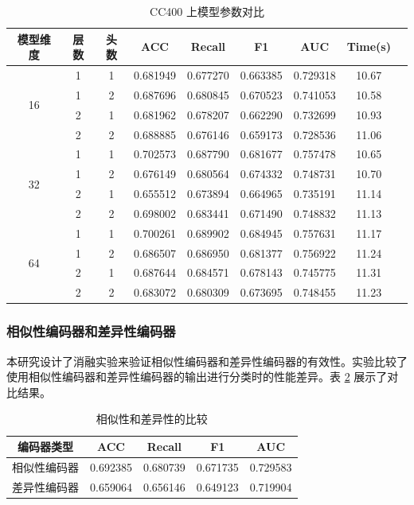 \documentclass[12pt,a4paper]{article}
\begin{document}
\begin{table}[H]
\centering
\caption{CC400 上模型参数对比}
\label{tab:attention_ablation}
\scriptsize
\begin{tabular}{ccccccccc}
\toprule
模型维度 & 层数 & 头数 & ACC & Recall & F1 & AUC & Time(s) \\
\midrule
\multirow{4}{*}{16} & 1 & 1 & 0.681949 & 0.677270 & 0.663385 & 0.729318 & 10.67 \\
 & 1 & 2 & 0.687696 & 0.680845 & 0.670523 & 0.741053 & 10.58 \\
 & 2 & 1 & 0.681962 & 0.678207 & 0.662290 & 0.732699 & 10.93 \\
 & 2 & 2 & 0.688885 & 0.676146 & 0.659173 & 0.728536 & 11.06 \\
\midrule
\multirow{4}{*}{32} & 1 & 1 & 0.702573 & 0.687790 & 0.681677 & 0.757478 & 10.65 \\
 & 1 & 2 & 0.676149 & 0.680564 & 0.674332 & 0.748731 & 10.70 \\
 & 2 & 1 & 0.655512 & 0.673894 & 0.664965 & 0.735191 & 11.14 \\
 & 2 & 2 & 0.698002 & 0.683441 & 0.671490 & 0.748832 & 11.13 \\
\midrule
\multirow{4}{*}{64} & 1 & 1 & 0.700261 & 0.689902 & 0.684945 & 0.757631 & 11.17 \\
 & 1 & 2 & 0.686507 & 0.686950 & 0.681377 & 0.756922 & 11.24 \\
 & 2 & 1 & 0.687644 & 0.684571 & 0.678143 & 0.745775 & 11.31 \\
 & 2 & 2 & 0.683072 & 0.680309 & 0.673695 & 0.748455 & 11.23 \\
\bottomrule
\end{tabular}
\end{table}

\subsubsection{相似性编码器和差异性编码器}

本研究设计了消融实验来验证相似性编码器和差异性编码器的有效性。实验比较了使用相似性编码器和差异性编码器的输出进行分类时的性能差异。表 \ref{tab:sim_diff} 展示了对比结果。

\begin{table}[H]
\centering
\caption{相似性和差异性的比较}
\label{tab:sim_diff}
\begin{tabular}{ccccc}
\toprule
编码器类型 & ACC & Recall & F1 & AUC \\
\midrule
相似性编码器 & 0.692385 & 0.680739 & 0.671735 & 0.729583 \\
差异性编码器 & 0.659064 & 0.656146 & 0.649123 & 0.719904 \\
\bottomrule
\end{tabular}
\end{table}
\end{document}
